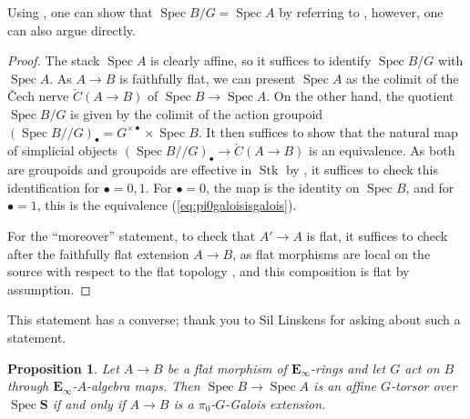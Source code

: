 \documentclass[11pt, a4paper]{article}
\DeclareMathOperator{\Spec}{Spec}
\newcommand{\1}{\mathbf{1}}
\newcommand{\Sph}{\mathbf{S}}
\DeclareMathOperator{\Stk}{Stk}
\newcommand{\E}{\mathbf{E}}
\theoremstyle{plain}
\newtheorem{prop}[equation]{Proposition}
\theoremstyle{definition}
\theoremstyle{remark}\numberwithin{equation}{section}
\begin{document}
Using , one can show that $\Spec B /G =\Spec A$ by referring to \cite[Pr.3.2.2.5]{sag}, however, one can also argue directly.

\begin{proof}
    The stack $\Spec A$ is clearly affine, so it suffices to identify $\Spec B / G$ with $\Spec A$. As $A \to B$ is faithfully flat, we can present $\Spec A$ as the colimit of the Čech nerve $\check{C}(A\to B)$ of $\Spec B \to \Spec A$. On the other hand, the quotient $\Spec B / G$ is given by the colimit of the action groupoid $(\Spec B // G)_\bullet = G^{\times \bullet} \times \Spec B$. It then suffices to show that the natural map of simplicial objects $(\Spec B // G)_\bullet \to \check{C}(A\to B)$ is an equivalence. As both are groupoids and groupoids are effective in $\Stk$ by \cite[Pr.2.1.2.9(3)]{reconstruction}, it suffices to check this identification for $\bullet=0,1$. For $\bullet=0$, the map is the identity on $\Spec B$, and for $\bullet=1$, this is the equivalence (\ref{eq:pi0galoisisgalois}).
    
    For the ``moreover'' statement, to check that $A' \to A$ is flat, it suffices to check after the faithfully flat extension $A \to B$, as flat morphisms are local on the source with respect to the flat topology \cite[Lm.B.1.4.2(2)]{sag}, and this composition is flat by assumption.
\end{proof}

This statement has a converse; thank you to Sil Linskens for asking about such a statement.

\begin{prop}\label{pr:converse}
    Let $A \to B$ be a flat morphism of $\E_\infty$-rings and let $G$ act on $B$ through $\E_\infty$-$A$-algebra maps. Then $\Spec B \to \Spec A$ is an affine $G$-torsor over $\Spec \Sph$ if and only if $A \to B$ is a $\pi_0$-$G$-Galois extension.
\end{prop}
\end{document}

